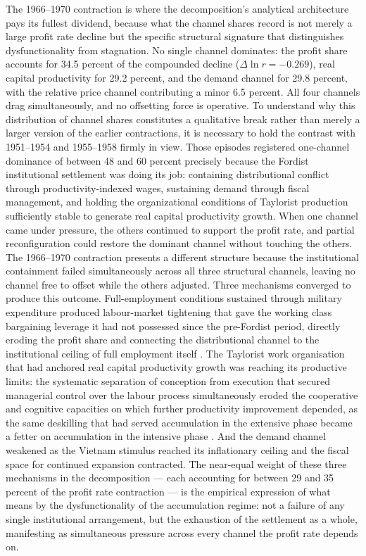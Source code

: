 The 1966--1970 contraction is where the decomposition's analytical
architecture pays its fullest dividend, because what the channel shares
record is not merely a large profit rate decline but the specific
structural signature that distinguishes dysfunctionality from stagnation.
No single channel dominates: the profit share accounts for 34.5 percent
of the compounded decline ($\Delta\ln r = -0.269$), real capital
productivity for 29.2 percent, and the demand channel for 29.8 percent,
with the relative price channel contributing a minor 6.5 percent.
All four channels drag simultaneously, and no offsetting force is
operative. To understand why this distribution of channel shares
constitutes a qualitative break rather than merely a larger version of
the earlier contractions, it is necessary to hold the contrast with 1951--1954
and 1955--1958 firmly in view. Those episodes registered one-channel
dominance of between 48 and 60 percent precisely because the Fordist
institutional settlement was doing its job: containing distributional
conflict through productivity-indexed wages, sustaining demand through
fiscal management, and holding the organizational conditions of Taylorist
production sufficiently stable to generate real capital productivity
growth. When one channel came under pressure, the others continued to
support the profit rate, and partial reconfiguration could restore the
dominant channel without touching the others. The 1966--1970 contraction
presents a different structure because the institutional containment
failed simultaneously across all three structural channels, leaving no
channel free to offset while the others adjusted. Three mechanisms
converged to produce this outcome. Full-employment conditions sustained
through military expenditure produced labour-market tightening that gave
the working class bargaining leverage it had not possessed since the
pre-Fordist period, directly eroding the profit share and connecting the
distributional channel to the institutional ceiling of full employment
itself \citep{Baker1996, Vidal2019}. The Taylorist work organisation
that had anchored real capital productivity growth was reaching its
productive limits: the systematic separation of conception from execution
that secured managerial control over the labour process simultaneously
eroded the cooperative and cognitive capacities on which further
productivity improvement depended, as the same deskilling that had served
accumulation in the extensive phase became a fetter on accumulation in
the intensive phase \citep{Braverman1998, Vidal2022}. And the demand
channel weakened as the Vietnam stimulus reached its inflationary ceiling
and the fiscal space for continued expansion contracted. The near-equal
weight of these three mechanisms in the decomposition --- each accounting
for between 29 and 35 percent of the profit rate contraction --- is the
empirical expression of what \citet{Vidal2014} means by the dysfunctionality
of the accumulation regime: not a failure of any single institutional
arrangement, but the exhaustion of the settlement as a whole, manifesting
as simultaneous pressure across every channel the profit rate depends on.

